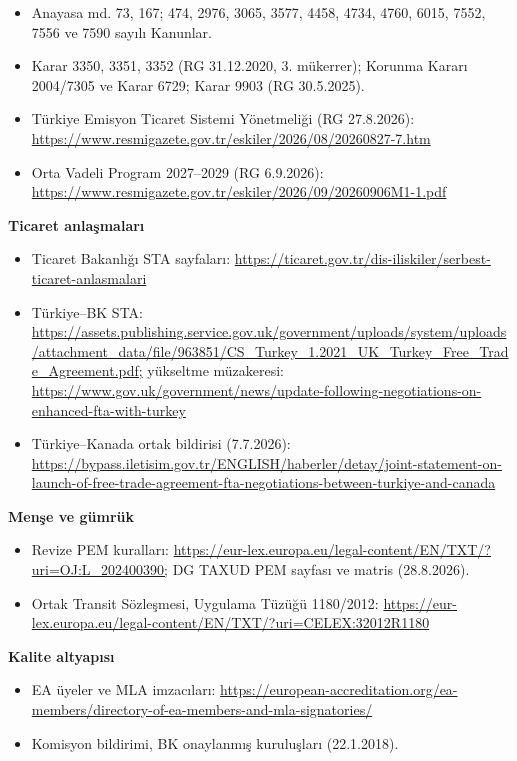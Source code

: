 \begin{itemize}
\tightlist
\item
  Anayasa md. 73, 167; 474, 2976, 3065, 3577, 4458, 4734, 4760, 6015, 7552, 7556 ve 7590 sayılı Kanunlar.
\item
  Karar 3350, 3351, 3352 (RG 31.12.2020, 3. mükerrer); Korunma Kararı 2004/7305 ve Karar 6729; Karar 9903 (RG 30.5.2025).
\item
  Türkiye Emisyon Ticaret Sistemi Yönetmeliği (RG 27.8.2026): \url{https://www.resmigazete.gov.tr/eskiler/2026/08/20260827-7.htm}
\item
  Orta Vadeli Program 2027--2029 (RG 6.9.2026): \url{https://www.resmigazete.gov.tr/eskiler/2026/09/20260906M1-1.pdf}
\end{itemize}

\textbf{Ticaret anlaşmaları}

\begin{itemize}
\tightlist
\item
  Ticaret Bakanlığı STA sayfaları: \url{https://ticaret.gov.tr/dis-iliskiler/serbest-ticaret-anlasmalari}
\item
  Türkiye--BK STA: \url{https://assets.publishing.service.gov.uk/government/uploads/system/uploads/attachment_data/file/963851/CS_Turkey_1.2021_UK_Turkey_Free_Trade_Agreement.pdf;} yükseltme müzakeresi: \url{https://www.gov.uk/government/news/update-following-negotiations-on-enhanced-fta-with-turkey}
\item
  Türkiye--Kanada ortak bildirisi (7.7.2026): \url{https://bypass.iletisim.gov.tr/ENGLISH/haberler/detay/joint-statement-on-launch-of-free-trade-agreement-fta-negotiations-between-turkiye-and-canada}
\end{itemize}

\textbf{Menşe ve gümrük}

\begin{itemize}
\tightlist
\item
  Revize PEM kuralları: \url{https://eur-lex.europa.eu/legal-content/EN/TXT/?uri=OJ:L_202400390;} DG TAXUD PEM sayfası ve matris (28.8.2026).
\item
  Ortak Transit Sözleşmesi, Uygulama Tüzüğü 1180/2012: \url{https://eur-lex.europa.eu/legal-content/EN/TXT/?uri=CELEX:32012R1180}
\end{itemize}

\textbf{Kalite altyapısı}

\begin{itemize}
\tightlist
\item
  EA üyeler ve MLA imzacıları: \url{https://european-accreditation.org/ea-members/directory-of-ea-members-and-mla-signatories/}
\item
  Komisyon bildirimi, BK onaylanmış kuruluşları (22.1.2018).
\end{itemize}


